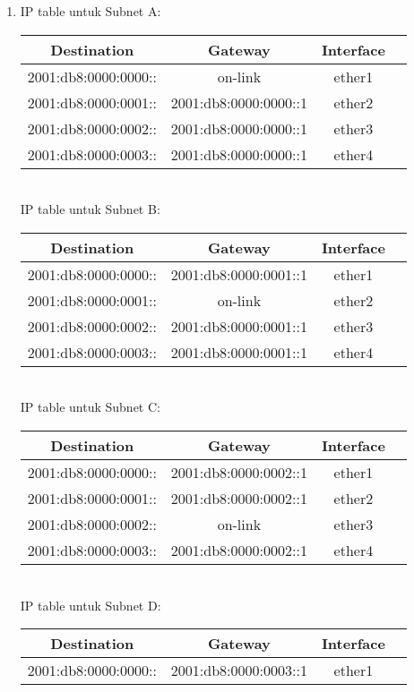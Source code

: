 \begin{enumerate}
	\item IP table untuk Subnet A:\\
	\begin{tabular}{| c | c | c | c |}
		\hline
		Destination & Gateway & Interface\\
		\hline
		2001:db8:0000:0000:: & on-link & ether1 \\
		\hline
		2001:db8:0000:0001:: & 2001:db8:0000:0000::1 & ether2\\
		\hline
		2001:db8:0000:0002:: & 2001:db8:0000:0000::1 & ether3\\
		\hline
		2001:db8:0000:0003:: & 2001:db8:0000:0000::1 & ether4\\
		\hline
	\end{tabular}\\
	IP table untuk Subnet B:\\
	\begin{tabular}{| c | c | c | c |}
		\hline
		Destination & Gateway & Interface\\
		\hline
		2001:db8:0000:0000:: & 2001:db8:0000:0001::1 & ether1 \\
		\hline
		2001:db8:0000:0001:: & on-link & ether2\\
		\hline
		2001:db8:0000:0002:: & 2001:db8:0000:0001::1 & ether3\\
		\hline
		2001:db8:0000:0003:: & 2001:db8:0000:0001::1 & ether4\\
		\hline
	\end{tabular}\\
	IP table untuk Subnet C:\\
	\begin{tabular}{| c | c | c | c |}
		\hline
		Destination & Gateway & Interface\\
		\hline
		2001:db8:0000:0000:: & 2001:db8:0000:0002::1 & ether1 \\
		\hline
		2001:db8:0000:0001:: & 2001:db8:0000:0002::1 & ether2\\
		\hline
		2001:db8:0000:0002:: & on-link & ether3\\
		\hline
		2001:db8:0000:0003:: & 2001:db8:0000:0002::1 & ether4\\
		\hline
	\end{tabular}\\
	IP table untuk Subnet D:\\
	\begin{tabular}{| c | c | c | c |}
		\hline
		Destination & Gateway & Interface\\
		\hline
		2001:db8:0000:0000:: & 2001:db8:0000:0003::1 & ether1 \\

\end{tabular}
\end{enumerate}
